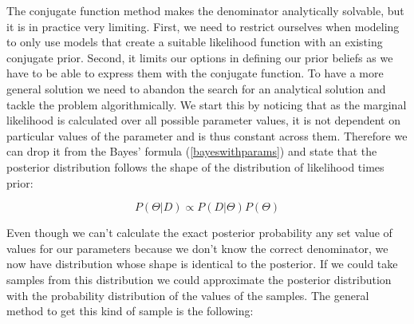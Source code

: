 \documentclass[12pt,a4paper,leqno]{report}
\theoremstyle{plain}
\theoremstyle{definition}
\theoremstyle{remark}
\begin{document}
The conjugate function method makes the denominator analytically solvable, but it
is in practice very limiting. First, we need to restrict ourselves when
modeling to only use models that create a suitable likelihood function with an existing conjugate prior. Second, it limits our options in defining our prior
beliefs as we have to be able to express them with the conjugate function. To
have a more general solution we need to abandon the search for an analytical
solution and tackle the problem algorithmically. We start this by noticing that
as the marginal likelihood is calculated over all possible parameter values, it is
not dependent on particular values of the parameter and is thus constant across
them. Therefore we can drop it from the Bayes' formula (\ref{bayeswithparams}) and state that the posterior
distribution follows the shape of the distribution of likelihood times prior:

\begin{def}\label{bayespropto}
    \begin{equation}
        P(\Theta|D) \propto P(D|\Theta)P(\Theta)
    \end{equation}
\end{def}

Even though we can't calculate the exact posterior probability any set value of
values for our parameters because we don't know the correct denominator, we now
have distribution whose shape is identical to the posterior. If we could take
samples from this distribution we could approximate the posterior distribution
with the probability distribution of the values of the samples. The general
method to get this kind of sample is the following:
\end{document}
